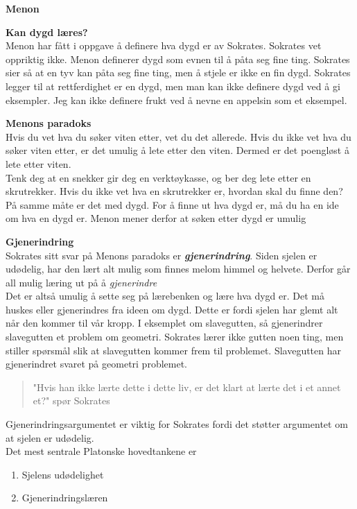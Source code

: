 \documentclass[11pt, a4paper]{article}
\newenvironment{sectionbox}[1][]{%
    \begin{sectionboxinner}
    \textbf{\large #1}
    \vspace{1pt}
    \newline
}{%
    \end{sectionboxinner}
}
\newenvironment{subsectionbox}[1][]{%
    \begin{subsectionboxinner}
        {\bfseries #1}\\[-2pt]
}{%
    \end{subsectionboxinner}
}
\begin{document}
\begin{sectionbox}[Menon]
\begin{subsectionbox}[Kan dygd læres?]
Menon har fått i oppgave å definere hva dygd er av Sokrates. Sokrates vet oppriktig ikke. Menon definerer dygd som evnen til å påta seg fine ting. Sokrates sier så at en tyv kan påta seg fine ting, men å stjele er ikke en fin dygd. Sokrates legger til at rettferdighet er en dygd, men man kan ikke definere dygd ved å gi eksempler. Jeg kan ikke definere frukt ved å nevne en appelsin som et eksempel.

\end{subsectionbox}

\begin{subsectionbox}[Menons paradoks]
Hvis du vet hva du søker viten etter, vet du det allerede. Hvis du ikke vet hva du søker viten etter, er det umulig å lete etter den viten. Dermed er det poengløst å lete etter viten.\\

Tenk deg at en snekker gir deg en verktøykasse, og ber deg lete etter en skrutrekker. Hvis du ikke vet hva en skrutrekker er, hvordan skal du finne den? På samme måte er det med dygd. For å finne ut hva dygd er, må du ha en ide om hva en dygd er. Menon mener derfor at søken etter dygd er umulig
\end{subsectionbox}

\begin{subsectionbox}[Gjenerindring]
Sokrates sitt svar på Menons paradoks er \textbf{\textit{gjenerindring}}. Siden sjelen er udødelig, har den lært alt mulig som finnes melom himmel og helvete. Derfor går all mulig læring ut på å \textit{gjenerindre}\\

Det er altså umulig å sette seg på lærebenken og lære hva dygd er. Det må huskes eller gjenerindres fra ideen om dygd. Dette er fordi sjelen har glemt alt når den kommer til vår kropp. I eksemplet om slavegutten, så gjenerindrer slavegutten et problem om geometri. Sokrates lærer ikke gutten noen ting, men stiller spørsmål slik at slavegutten kommer frem til problemet. Slavegutten har gjenerindret svaret på geometri problemet. 

\begin{quote}
    "Hvis han ikke lærte dette i dette liv, er det klart at lærte det i et annet et?" spør Sokrates
\end{quote}

Gjenerindringsargumentet er viktig for Sokrates fordi det støtter argumentet om at sjelen er udødelig. \\

Det mest sentrale Platonske hovedtankene er 
\begin{enumerate}
    \item Sjelens udødelighet
    \item Gjenerindringslæren
\end{enumerate}


\end{subsectionbox}
\end{sectionbox}
\end{document}
